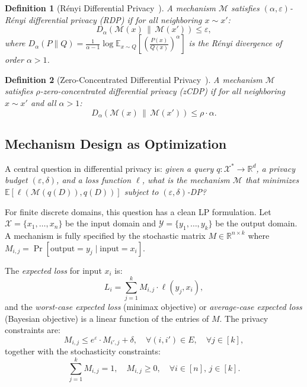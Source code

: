 \documentclass[11pt,a4paper]{article}
\newcommand{\eps}{\varepsilon}
\newcommand{\E}{\mathbb{E}}
\newcommand{\R}{\mathbb{R}}
\newcommand{\cM}{\mathcal{M}}
\newcommand{\cX}{\mathcal{X}}
\newcommand{\cY}{\mathcal{Y}}
\newtheorem{definition}{Definition}[section]
\begin{document}
\begin{definition}[R\'enyi Differential Privacy~\cite{mironov2017renyi}]
\label{def:rdp}
A mechanism $\cM$ satisfies $(\alpha, \eps)$-R\'enyi differential privacy
(RDP) if for all neighboring $x \sim x'$:
\[
  D_\alpha\!\left(\cM(x) \,\|\, \cM(x')\right) \le \eps,
\]
where $D_\alpha(P \| Q) = \frac{1}{\alpha - 1} \log \E_{x \sim Q}\left[\left(\frac{P(x)}{Q(x)}\right)^\alpha\right]$
is the R\'enyi divergence of order $\alpha > 1$.
\end{definition}

\begin{definition}[Zero-Concentrated Differential Privacy~\cite{bun2016concentrated}]
\label{def:zcdp}
A mechanism $\cM$ satisfies $\rho$-zero-concentrated differential privacy
(zCDP) if for all neighboring $x \sim x'$ and all $\alpha > 1$:
\[
  D_\alpha\!\left(\cM(x) \,\|\, \cM(x')\right) \le \rho \cdot \alpha.
\]
\end{definition}

\subsection{Mechanism Design as Optimization}
\label{subsec:mechopt}

A central question in differential privacy is: \emph{given a query
$q: \cX^* \to \R^d$, a privacy budget $(\eps,\delta)$, and a loss function
$\ell$, what is the mechanism $\cM$ that minimizes $\E[\ell(\cM(q(D)), q(D))]$
subject to $(\eps,\delta)$-DP?}

For finite discrete domains, this question has a clean LP formulation.
Let $\cX = \{x_1, \ldots, x_n\}$ be the input domain and
$\cY = \{y_1, \ldots, y_k\}$ be the output domain.  A mechanism is fully
specified by the stochastic matrix $M \in \R^{n \times k}$ where
$M_{i,j} = \Pr[\text{output} = y_j \mid \text{input} = x_i]$.

The \emph{expected loss} for input $x_i$ is:
\[
  L_i = \sum_{j=1}^{k} M_{i,j} \cdot \ell(y_j, x_i),
\]
and the \emph{worst-case expected loss} (minimax objective) or
\emph{average-case expected loss} (Bayesian objective) is a linear function
of the entries of $M$.  The privacy constraints are:
\begin{equation}
\label{eq:privacy_constraints}
  M_{i,j} \le e^{\eps} \cdot M_{i',j} + \delta, \quad
  \forall (i, i') \in E, \quad \forall j \in [k],
\end{equation}
together with the stochasticity constraints:
\begin{equation}
\label{eq:stochastic}
  \sum_{j=1}^{k} M_{i,j} = 1, \quad M_{i,j} \ge 0, \quad \forall i \in [n], \, j \in [k].
\end{equation}
\end{document}
